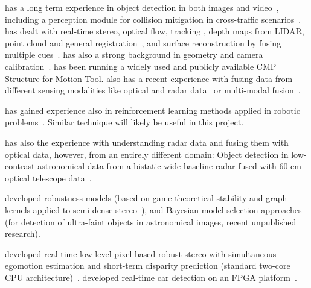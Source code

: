 \PRAGUE has a long term experience in object detection in both images
and
video~\cite{Zimmermann-PAMI2009,Zimmermann-Hurych-Svoboda-PAMI2014},
including a perception module for collision mitigation in
cross-traffic scenarios~\cite{Heck-IV2013}. \PRAGUE has dealt with
real-time stereo, optical flow, tracking
\cite{Cerman-Hlavac-ICPR-2012,Prisacariu-ICPR-2010}, depth maps from
LIDAR, point cloud and general
registration~\cite{Sara3DIM05,Bujnak-ICCV2007}, and surface
reconstruction by fusing multiple cues~\cite{Tylecek-IJVR-2010}.
\PRAGUE has also a strong background in geometry and camera
calibration~\cite{Torii-Havlena-IJCV-2011,Kukelova-Pajdla-PAMI-2011,Kukelova-Bujnak-Pajdla-PAMI-2012}.
\PRAGUE has been running a widely used and publicly available CMP
Structure for Motion Tool.  \PRAGUE also has a recent experience with
fusing data from different sensing modalities like optical and radar
data~\cite{Navara-AMOS-2013} or multi-modal
fusion~\cite{Kubelka-JFR2014}.
 
\PRAGUE has gained experience also in reinforcement learning methods
applied in robotic problems~\cite{zimmermann-icra2014}. Similar
technique will likely be useful in this project.

\PRAGUE has also the experience with understanding radar data and
fusing them with optical data, however, from an entirely different
domain: Object detection in low-contrast astronomical data from a
bistatic wide-baseline radar fused with 60 cm optical telescope
data~\cite{Navara-AMOS-2013}.
 
\PRAGUE developed robustness models (based on game-theoretical
stability and graph kernels applied to semi-dense
stereo~\cite{Sara-ECCV02}), and Bayesian model selection approaches
(for detection of ultra-faint objects in astronomical images, recent
unpublished research).
 
\PRAGUE developed real-time low-level pixel-based robust stereo with
simultaneous egomotion estimation and short-term disparity prediction
(standard two-core CPU architecture)~\cite{DobiasICCV-LDRMC2011}.
\PRAGUE developed real-time car detection on an FPGA
platform~\cite{Sychrovsky-FPL2013}.

%

 

